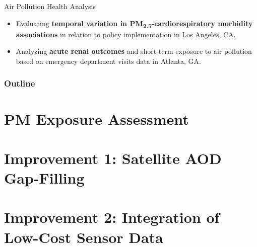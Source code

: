 \documentclass[12pt]{beamer}
\begin{document}
\begin{frame}{Air Pollution Health Analysis}
    \begin{itemize}
        \item Evaluating \textbf{temporal variation in PM\textsubscript{2.5}-cardiorespiratory morbidity associations} in relation to policy implementation in Los Angeles, CA.
        \item Analyzing \textbf{acute renal outcomes} and short-term exposure to air pollution based on emergency department visits data in Atlanta, GA.
    \end{itemize}
\end{frame}

\begin{frame}
  \titlepage
\end{frame}
\begin{frame}
\frametitle{Outline}
\tableofcontents
\end{frame}

\section{PM Exposure Assessment}

\section{Improvement 1: Satellite AOD Gap-Filling}

\section{Improvement 2: Integration of Low-Cost Sensor Data}


\end{document}

